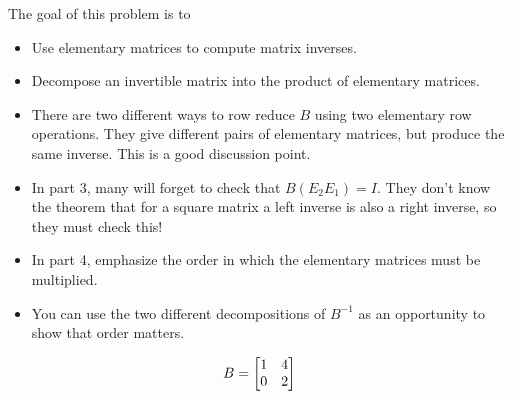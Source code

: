 	\bookonlynewpage
	\question
	\begin{annotation}
		\begin{goals}

			The goal of this problem is to
			\begin{itemize}
				\item Use elementary matrices to compute matrix inverses.
				\item Decompose an invertible matrix into the product of elementary matrices.
			\end{itemize}
		\end{goals}

		\begin{notes}
			\begin{itemize}
				\item There are two different ways to row reduce $B$ using two elementary row
					operations. They give different pairs of elementary matrices, but produce
					the same inverse. This is a good discussion point.
				\item In part 3, many will forget to check that $B(E_2E_1)=I$. They don't know
					the theorem that for a square matrix a left inverse is also a right inverse,
					so they must check this!
				\item In part 4, emphasize the order in which the elementary matrices must be multiplied.
				\item You can use the two different decompositions of $B^{-1}$ as an opportunity to
					show that order matters.
			\end{itemize}
		\end{notes}
	\end{annotation}
	\[
		B=\mat{1 &4\\0 &2}
	\]

